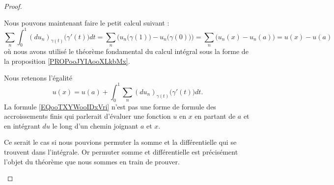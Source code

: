 \begin{proof}
\begin{subproof}
		Nous pouvons maintenant faire le petit calcul suivant :
		\begin{equation}
			\sum_n\int_0^1(du_n)_{\gamma(t)}\big( \gamma'(t) \big)dt=\sum_n\Big( u_n\big( \gamma(1) \big)-u_n\big( \gamma(0) \big) \Big)=\sum_n\big( u_n(x)-u_n(a) \big)=u(x)-u(a)
		\end{equation}
		où nous avons utilisé le théorème fondamental du calcul intégral sous la forme de la proposition \ref{PROPooJYIAooXLkbMx}.

		Nous retenons l'égalité
		\begin{equation}        \label{EQooTXYWooIDxVri}
			u(x)=u(a)+\int_0^1\sum_n(du_n)_{\gamma(t)}\big( \gamma'(t) \big)dt.
		\end{equation}
		\spitem[Remarque]
		La formule \eqref{EQooTXYWooIDxVri} n'est pas une forme de formule des accroissements finis qui parlerait d'évaluer une fonction \( u\) en \( x\) en partant de \( a\) et en intégrant \( du\) le long d'un chemin joignant \( a\) et \( x\).

		Ce serait le cas si nous pouvions permuter la somme et la différentielle qui se trouvent dans l'intégrale. Or permuter somme et différentielle est précisément l'objet du théorème que nous sommes en train de prouver.

		\spitem[Différentielle]


\end{subproof}
\end{proof}
